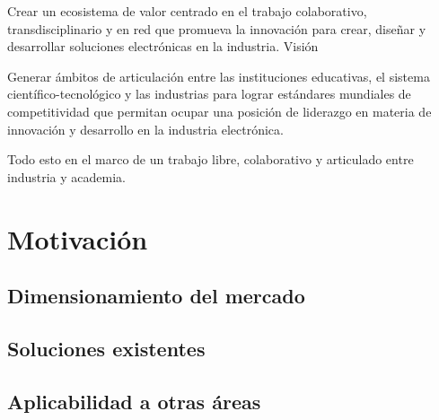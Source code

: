 Crear un ecosistema de valor centrado en el trabajo colaborativo, transdisciplinario y en red que promueva la innovación para crear, diseñar y desarrollar soluciones electrónicas en la industria.
Visión

Generar ámbitos de articulación entre las instituciones educativas, el sistema científico-tecnológico y las industrias para lograr estándares mundiales de competitividad que permitan ocupar una posición de liderazgo en materia de innovación y desarrollo en la industria electrónica.

Todo esto en el marco de un trabajo libre, colaborativo y articulado entre industria y academia. 


\section{Motivación}


\subsection{Dimensionamiento del mercado}

\subsection{Soluciones existentes}

\subsection{Aplicabilidad a otras áreas}





